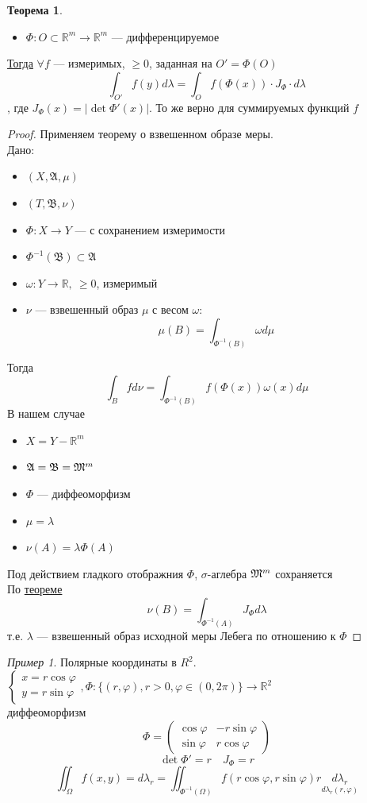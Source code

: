 \documentclass[oneside]{book}
\newcommand{\R}{\mathbb{R}}
\newcommand{\A}{\mathfrak{A}}
\newcommand{\B}{\mathfrak{B}}
\theoremstyle{plain}
\theoremstyle{remark}
\newtheorem*{examp}{Пример}
\theoremstyle{definition}
\newtheorem{theorem}{Теорема}[section]
\begin{document}
\begin{theorem}
\-
\begin{itemize}
\item \(\Phi: O \subset \R^m \to \R^m\) --- дифференцируемое
\end{itemize}
\uline{Тогда} \(\forall f\) --- измеримых, \(\ge 0\), заданная на \(O' = \Phi(O)\)
\[ \int_{O'}f(y) d\lambda = \int_O f(\Phi(x)) \cdot J_\Phi \cdot d\lambda \]
, где \(J_\Phi(x) = |\det \Phi'(x)|\). То же верно для суммируемых функций \(f\)
\end{theorem}
\begin{proof}
Применяем теорему о взвешенном образе меры. \\
Дано:
\begin{itemize}
\item \((X, \A, \mu)\)
\item \((T, \B, \nu)\)
\item \(\Phi: X \to Y\) --- с сохранением измеримости
\item \(\Phi^{-1}(\B) \subset \A\)
\item \(\omega: Y \to \R,\ \ge 0\), измеримый
\item \(\nu\) --- взвешенный образ \(\mu\) с весом \(\omega\): \[\mu(B) = \int_{\Phi^{-1}(B)} \omega d\mu\]
\end{itemize}
Тогда \[ \int_B f d\nu = \int_{\Phi^{-1}(B)}f(\Phi(x)) \omega(x) d\mu \]
В нашем случае
\begin{itemize}
\item \(X = Y - \R^m\)
\item \(\A = \B = \M^m\)
\item \(\Phi\) --- диффеоморфизм
\item \(\mu = \lambda\)
\item \(\nu(A) = \lambda \Phi(A)\)
\end{itemize}
Под действием гладкого отображния \(\Phi\), \(\sigma\)-аглебра \(\mathfrak{M}^m\) сохраняется \\
По \hyperref[org550ce1d]{теореме} \[\nu(B) = \int_{\Phi^{-1}(A)} J_\Phi d\lambda\]
т.е. \(\lambda\) --- взвешенный образ исходной меры Лебега по отношению к \(\Phi\)
\end{proof}
\begin{examp}
Полярные координаты в \(R^2\). \\
\(\left\{\begin{array}{l} x = r\cos\varphi \\ y = r\sin\varphi \end{array}\right., \Phi: \{(r, \varphi), r> 0, \varphi \in (0, 2\pi)\} \to \R^2\) \\
диффеоморфизм \[ \Phi = \begin{pmatrix} \cos \varphi & -r \sin\varphi \\ \sin \varphi & r \cos\varphi\end{pmatrix} \]
\[ \det \Phi' = r\quad J_\Phi = r \]
\[ \iint_\Omega f(x, y) = d\lambda_r = \iint_{\Phi^{-1}(\Omega)} f(r \cos\varphi, r\sin\varphi) r \underset{d \lambda_r(r, \varphi)}{d\lambda_r} \]
\end{examp}
\end{document}
